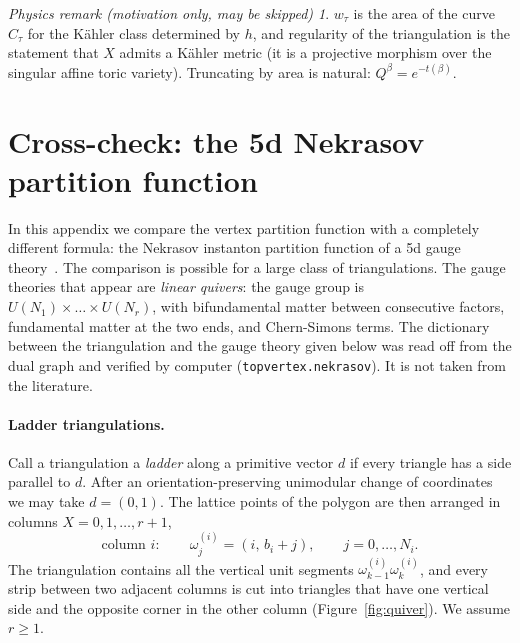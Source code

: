 \documentclass[11pt]{article}
\theoremstyle{plain}
\theoremstyle{definition}
\theoremstyle{remark}
\newtheorem*{physrem}{Physics remark (motivation only, may be skipped)}
\begin{document}
\begin{physrem}
$w_\tau$ is the area of the curve $C_\tau$ for the K\"ahler class determined by $h$, and
regularity of the triangulation is the statement that $X$ admits a K\"ahler metric (it is a
projective morphism over the singular affine toric variety). Truncating by area is natural:
$Q^\beta=e^{-t(\beta)}$.
\end{physrem}

\appendix
\section{Cross-check: the 5d Nekrasov partition function}\label{app:nekrasov}

In this appendix we compare the vertex partition function with a completely different formula:
the Nekrasov instanton partition function of a 5d gauge theory~\cite{Nekrasov,IKP-SUN}. The
comparison is possible for a large class of triangulations. The gauge theories that appear are \textit{linear quivers}:
the gauge group is $U(N_1)\times\ldots\times U(N_r)$, with bifundamental matter between
consecutive factors, fundamental matter at the two ends, and Chern-Simons terms. The dictionary
between the triangulation and the gauge theory given below was read off from the dual graph and
verified by computer (\texttt{topvertex.nekrasov}). It is not taken from the literature.

\paragraph{Ladder triangulations.} Call a triangulation a \textit{ladder} along a primitive
vector $d$ if every triangle has a side parallel to $d$. After an orientation-preserving
unimodular change of coordinates we may take $d=(0,1)$. The lattice points of the polygon are
then arranged in columns $X=0,1,\ldots,r+1$,
\begin{equation}
\text{column } i:\qquad \omega^{(i)}_j=(i,\,b_i+j),\qquad j=0,\ldots,N_i .
\end{equation}
The triangulation contains all the vertical unit segments $\omega^{(i)}_{k-1}\omega^{(i)}_k$,
and every strip between two adjacent columns is cut into triangles that have one vertical side
and the opposite corner in the other column (Figure~\ref{fig:quiver}). We assume $r\ge1$.
\end{document}
